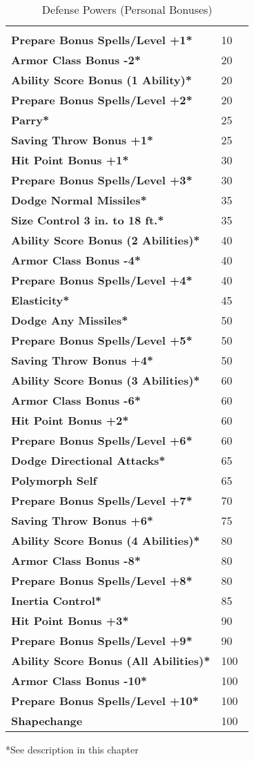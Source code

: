 \begin{multicols*}{2}
\begin {table}[H]
  \caption{Defense Powers (Personal Bonuses)}
  \begin{tabularx}{\columnwidth}{>{\bfseries}YY}
   & \\
	Prepare Bonus Spells/Level +1* & 10\\
	Armor Class Bonus -2* & 20\\
	Ability Score Bonus (1 Ability)* & 20\\
	Prepare Bonus Spells/Level +2* & 20\\
	Parry* & 25\\
	Saving Throw Bonus +1* & 25\\
	Hit Point Bonus +1* & 30\\
	Prepare Bonus Spells/Level +3* & 30\\
	Dodge Normal Missiles* & 35\\
	Size Control 3 in. to 18 ft.* & 35\\
	Ability Score Bonus (2 Abilities)* & 40\\
	Armor Class Bonus -4* & 40\\
	Prepare Bonus Spells/Level +4* & 40\\
	Elasticity* & 45\\
	Dodge Any Missiles* & 50\\
	Prepare Bonus Spells/Level +5* & 50\\
	Saving Throw Bonus +4* & 50\\
	Ability Score Bonus (3 Abilities)* & 60\\
	Armor Class Bonus -6* & 60\\
	Hit Point Bonus +2* & 60\\
	Prepare Bonus Spells/Level +6* & 60\\
	Dodge Directional Attacks* & 65\\
	Polymorph Self & 65\\
	Prepare Bonus Spells/Level +7* & 70\\
	Saving Throw Bonus +6* & 75\\
	Ability Score Bonus (4 Abilities)* & 80\\
	Armor Class Bonus -8* & 80\\
	Prepare Bonus Spells/Level +8* & 80\\
	Inertia Control* & 85\\
	Hit Point Bonus +3* & 90\\
	Prepare Bonus Spells/Level +9* & 90\\
	Ability Score Bonus (All Abilities)* & 100\\
	Armor Class Bonus -10* & 100\\
	Prepare Bonus Spells/Level +10* & 100\\
	Shapechange & 100\
  \end {tabularx}
	*See description in this chapter
\end {table}


\end{multicols*}
